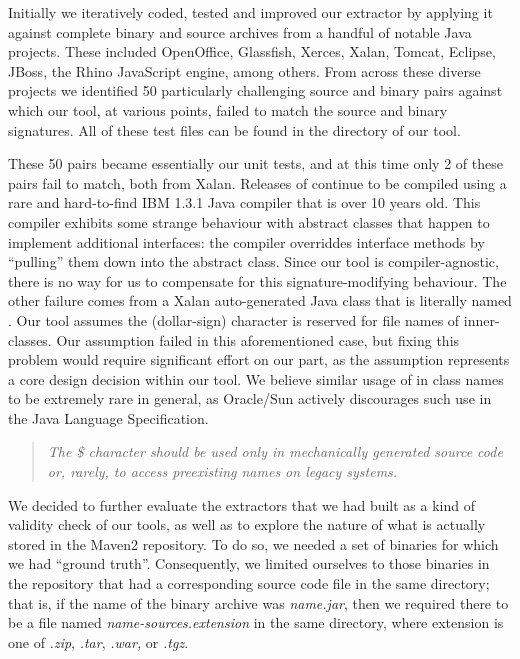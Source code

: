 Initially we iteratively coded, tested and improved our extractor by
applying it against complete binary and source archives from a handful of 
notable Java projects.  These included OpenOffice, Glassfish, Xerces, Xalan, Tomcat,
Eclipse, JBoss, the Rhino JavaScript engine, among others.
From across these diverse projects we identified 50 particularly
challenging source and binary pairs against which our tool, at various points,
failed to match the source and binary signatures.
All of these test files can be found in the  directory
of our tool.

These 50 pairs
became essentially our unit tests, and at this time only 2 of these
pairs fail to match, both from Xalan.
Releases of  continue to be compiled
using a rare and hard-to-find IBM 1.3.1 Java compiler that is over 10 years old.
This compiler exhibits some strange behaviour with abstract classes
that happen to implement additional interfaces:
the compiler overriddes interface methods by ``pulling'' them down into the abstract class.
Since our tool is compiler-agnostic, there is no way for us to compensate for this signature-modifying behaviour.
The other failure comes from a Xalan auto-generated Java class that is
literally
named .  Our tool assumes the \mytt{\$} (dollar-sign) character is reserved for file names
of inner-classes.  Our assumption failed in this aforementioned case, but fixing this
problem would require significant effort on our part, as the assumption represents a core design decision within our tool.
We believe similar usage of \mytt{\$} in class names to be extremely rare in general,
as Oracle/Sun actively discourages such use in the Java Language Specification.

\begin{quote}
\emph{The \$ character should be used only in mechanically
generated source code or, rarely, to access preexisting names on legacy systems. \cite{jls2}}
\end{quote}


We decided to further evaluate the extractors that we had built as a kind of
validity check of our tools, as well as to explore the nature of what is
actually stored in the Maven2 repository.  To do so, we needed a set of
binaries for which we had ``ground truth''.  Consequently, we limited
ourselves to those binaries in the repository that had a corresponding
source code file in the same directory; that is, if the name of the binary
archive was \emph{name.jar}, then we required there to be a file named
\emph{name-sources.extension} in the same directory, where extension is one
of \emph{.zip}, \emph{.tar}, \emph{.war,} or \emph{.tgz}.


